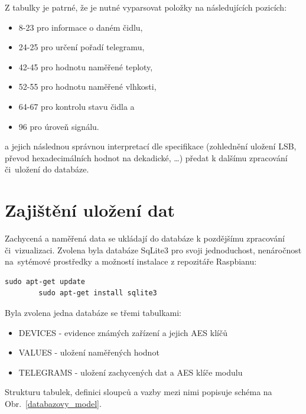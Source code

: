 Z tabulky je patrné, že je nutné vyparsovat položky na následujících pozicích:
\begin{itemize}
	\item 8-23 pro informace o daném čidlu,
	\item 24-25 pro určení pořadí telegramu,
	\item 42-45 pro hodnotu naměřené teploty,
	\item 52-55 pro hodnotu naměřené vlhkosti,
	\item 64-67 pro kontrolu stavu čidla a
	\item 96 pro úroveň signálu.	
\end{itemize}

a jejich následnou správnou interpretací dle specifikace (zohlednění uložení LSB, převod hexadecimálních hodnot na dekadické, \ldots) předat k dalšímu zpracování či~uložení do databáze.


\section{Zajištění uložení dat}
Zachycená a naměřená data se ukládají do databáze k pozdějšímu zpracování či~vizualizaci. Zvolena byla databáze SqLite3 pro svoji jednoduchost, nenáročnost na~sytémové prostředky a možností instalace z repozitáře Raspbianu:
 
\begin{lstlisting}[style=MyCodeBash]
		sudo apt-get update
		sudo apt-get install sqlite3
	\end{lstlisting}

Byla zvolena jedna databáze se třemi tabulkami:
\begin{itemize}
	\item DEVICES - evidence známých zařízení a jejich AES klíčů
	\item VALUES - uložení naměřených hodnot
	\item TELEGRAMS - uložení zachycených dat a AES klíče modulu
\end{itemize}

Strukturu tabulek, definici sloupců a vazby mezi nimi popisuje schéma na Obr.~\ref{databazovy_model}.

